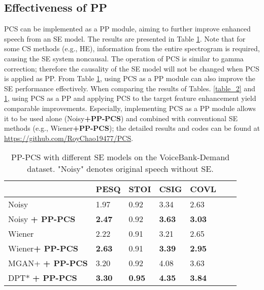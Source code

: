 \documentclass[a4paper]{article}
\begin{document}
\subsection {Effectiveness of PP}
PCS can be implemented as a PP module, aiming to further improve enhanced speech from an SE model. The results are presented in Table \ref{table_3}. Note that for some CS methods (e.g., HE), information from the entire spectrogram is required, causing the SE system noncausal. The operation of PCS is similar to gamma correction; therefore the causality of the SE model will not be changed when PCS is applied as PP. From Table \ref{table_3}, using PCS as a PP module can also improve the SE performance effectively. 
When comparing the results of Tables. \ref{table_2} and \ref{table_3}, using PCS as a PP and applying PCS to the target feature enhancement yield comparable improvements. Especially, implementing PCS as a PP module allows it to be used alone (Noisy\textbf{+PP-PCS}) and combined with conventional SE methods (e.g., Wiener\textbf{+PP-PCS}); the detailed results and codes can be found at \url{https://github.com/RoyChao19477/PCS}.




\begin{table}[h]
\caption{PP-PCS with different SE models on the VoiceBank-Demand dataset. "Noisy" denotes original speech without SE.}
\label{table_3}
\centering
\begin{tabular}{l||llllll} 
\hline
& PESQ & STOI & CSIG & COVL    \\
\hline
Noisy             & 1.97 & 0.92 & 3.34 & 2.63    \\
Noisy \textbf{+ PP-PCS} & \textbf{2.47} & 0.92 & \textbf{3.63}  & \textbf{3.03}  \\
Wiener             & 2.22 & 0.91 & 3.21  & 2.65        \\
Wiener\textbf{+ PP-PCS}      & \textbf{2.63} & 0.91 & \textbf{3.39}  & \textbf{2.95}        \\
MGAN+ \textbf{+ PP-PCS}    & 3.20 & 0.92 & 4.08 & 3.63    \\
DPT* \textbf{+ PP-PCS}     & \textbf{3.30} & \textbf{0.95} & \textbf{4.35} & \textbf{3.84}    \\
\hline
\end{tabular}
\end{table}
\end{document}
